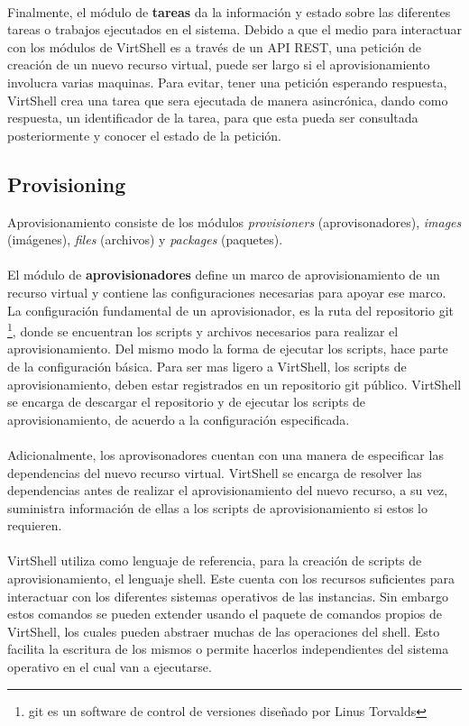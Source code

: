 \documentclass[conference, spanish]{IEEEtran}
\begin{document}
\\
Finalmente, el módulo de \textbf{tareas} da la información y estado sobre las diferentes tareas o trabajos ejecutados en el sistema. Debido a que el medio para interactuar con los módulos de VirtShell es a través de un API REST, una petición de creación de un nuevo recurso virtual, puede ser largo si el aprovisionamiento involucra varias maquinas. Para evitar, tener una petición esperando respuesta, VirtShell crea una tarea que sera ejecutada de manera asincrónica, dando como respuesta, un identificador de la tarea, para que esta pueda ser consultada posteriormente y conocer el estado de la petición.


\subsection{Provisioning}
Aprovisionamiento consiste de los módulos \emph{provisioners} (aprovisonadores), \emph{images} (imágenes), \emph{files} (archivos) y \emph{packages} (paquetes).\\
\\
El módulo de \textbf{aprovisionadores} define un marco de aprovisionamiento de un recurso virtual y contiene las configuraciones necesarias para apoyar ese marco. La configuración fundamental de un aprovisionador, es la ruta del repositorio git \footnote{git es un software de control de versiones diseñado por Linus Torvalds}, donde se encuentran los scripts y archivos necesarios para realizar el aprovisionamiento. Del mismo modo la forma de ejecutar los scripts, hace parte de la configuración básica. Para ser mas ligero a VirtShell, los scripts de aprovisionamiento, deben estar registrados en un repositorio git público. VirtShell se encarga de descargar el repositorio y de ejecutar los scripts de aprovisionamiento, de acuerdo a la configuración especificada. \\
\\
Adicionalmente, los aprovisonadores cuentan con una manera de especificar las dependencias del nuevo recurso virtual. VirtShell se encarga de resolver las dependencias antes de realizar el aprovisionamiento del nuevo recurso, a su vez, suministra información de ellas a los scripts de aprovisionamiento si estos lo requieren. \\
\\
VirtShell utiliza como lenguaje de referencia, para la creación de scripts de aprovisionamiento, el lenguaje shell. Este cuenta con los recursos suficientes para interactuar con los diferentes sistemas operativos de las instancias. Sin embargo estos comandos se pueden extender usando el paquete de comandos propios de VirtShell, los cuales pueden abstraer muchas de las operaciones del shell. Esto facilita la escritura de los mismos o permite hacerlos independientes del sistema operativo en el cual van a ejecutarse.\\
\end{document}
